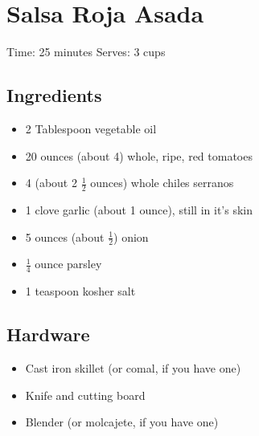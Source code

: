 \section{Salsa Roja Asada}
\label{salsaRojaAsada}
\setcounter{secnumdepth}{0}
Time: 25 minutes
Serves: 3 cups

\begin{multicols}{2}
\subsection*{Ingredients}
\begin{itemize}
    \item 2 Tablespoon vegetable oil
    \item 20 ounces (about 4) whole, ripe, red tomatoes
    \item 4 (about 2 \( \frac{1}{2} \) ounces) whole chiles serranos
    \item 1 clove garlic (about 1 ounce), still in it's skin
    \item 5 ounces (about \( \frac{1}{2} \)) onion
    \item \( \frac{1}{4} \) ounce parsley
    \item 1 teaspoon kosher salt
\end{itemize}

\subsection*{Hardware}
\begin{itemize}
    \item Cast iron skillet (or comal, if you have one)
    \item Knife and cutting board
    \item Blender (or molcajete, if you have one)
\end{itemize}
\clearpage


\end{multicols}
